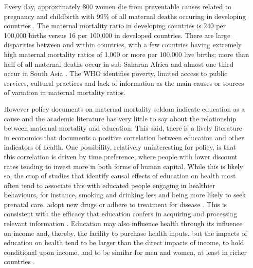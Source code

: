 \documentclass{article}[12pt,subeqn]
\begin{document}
\begin{spacing}{1.4}
Every day, approximately 800 women die from preventable causes related to 
pregnancy and childbirth with 99\% of all maternal deaths occuring in
developing countries \citep{WHO2012}. The maternal mortality ratio in developing
countries is 240 per 100,000 births versus 16 per 100,000 in developed countries.
There are large disparities between and within countries, with a few countries
having extremely high maternal mortality ratios of 1,000 or more per 100,000 live
births; more than half of all maternal deaths occur in sub-Saharan Africa and
almost one third occur in South Asia \citep{WHO2012}. The WHO identifies poverty,
limited access to public services, cultural practices and lack of information as
the main causes or sources of variation in maternal mortality ratios. 

However policy documents on maternal mortality seldom indicate education as a 
cause and the academic literature has very little to say about the relationship 
between maternal mortality and education. This said,
there is a lively literature in economics that documents a positive correlation 
between education and other indicators of health. One possibility, relatively 
uninteresting for policy, is that this correlation is driven by time preference, 
where people with lower discount rates tending to invest more in both forms of
human capital. While this is likely so, the crop of studies that identify causal 
effects of education on health most often tend to associate this with educated 
people engaging in healthier behaviours, for instance, smoking and drinking
less and being more likely to seek prenatal care, adopt new drugs or adhere to 
treatment for disease \citep{GoldmanSmith2010, GoldmanLakdawalla2001, 
CurrieMoretti2003, LichtenburgLlerasMuney2005, CutlerLlerasMuney2010,
GliedLlerasMuney2010, JensenLlerasMuney2012}. This is consistent with the 
efficacy that education confers in acquiring and processing relevant information 
\citep{Rosenzweig1995, RosenzweigSchultz1989, CutlerLlerasMuney2010}. Education 
may also influence health through its influence on income and, thereby, the 
facility to purchase health inputs, but the impacts of education on health tend
to be larger than the direct impacts of income, to hold conditional upon income,
and to be similar for men and women, at least in richer countries
\citep{LlerasMuney2005, CutlerLlerasMuney2010}.


\end{spacing}
\end{document}
